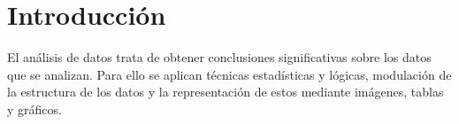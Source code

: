 \documentclass[a4paper, 12pt]{book}
\begin{document}




\tableofcontents 
\cleardoublepage
\listoffigures %
\cleardoublepage
\listoflistings


\cleardoublepage
\chapter{Introducción}
\label{sec:intro}
El análisis de datos trata de obtener conclusiones significativas sobre los datos que se analizan. Para ello se aplican técnicas estadísticas y lógicas, modulación de la estructura de los datos y la representación de estos mediante imágenes, tablas y gráficos.
\end{document}
